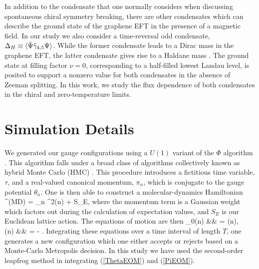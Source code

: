 \documentclass[aps,prd,twocolumn,showpacs,superscriptaddress,groupedaddress]{revtex4}  %
\begin{document}
In addition to the condensate that one normally considers when discussing spontaneous chiral symmetry breaking, there are other condensates which can describe the ground state of the graphene EFT
in the presence of a magnetic field. In our study we also consider a time-reversal odd condensate, $\Delta_H \equiv {\langle  {\bar \Psi}\tilde{\gamma}_{4,5} \Psi \rangle}$. While the former condensate leads to a Dirac
mass in the graphene EFT, the latter condensate gives rise to a Haldane mass \cite{Haldane}. The ground state at filling factor $\nu=0$, corresponding to a half-filled lowest Landau level, is posited to support a nonzero value for both condensates in the absence of Zeeman splitting. In this work,
we study the flux dependence of both condensates in the chiral and zero-temperature limits.
\section{\label{sec:Simulation}Simulation Details}
We generated our gauge configurations using a $U(1)$ variant of the $\Phi$ algorithm \cite{PhiAlgorithm}. This algorithm falls under a broad class of algorithms collectively known as
hybrid Monte Carlo (HMC) \cite{KogutDuane}. This procedure introduces a fictitious time variable, $\tau$, and a real-valued canonical momentum, $\pi_n$, which is conjugate to the gauge potential $\theta_n$. One is then able to construct a molecular-dynamics Hamiltonian
\beq
\label{HMCHamiltonian}
^{(MD)} =  \sum_n \pi^2(n) + S_E,
\eeq
where the momentum term is a Gaussian weight which factors out during the calculation of expectation values, and $S_E$ is our Euclidean lattice action. The equations of motion are then 
\beq
\label{ThetaEOM}
_0(n) &\equiv&  = \pi(n), \\
\label{PiEOM}
\dot{\pi}(n) &\equiv&  = - .
\eeq
Integrating these equations over a time interval of length $T$, one generates a new configuration which one either accepts or rejects based on a Monte-Carlo Metropolis decision.
In this study we have used the second-order leapfrog method in integrating (\ref{ThetaEOM}) and (\ref{PiEOM}).
\end{document}
